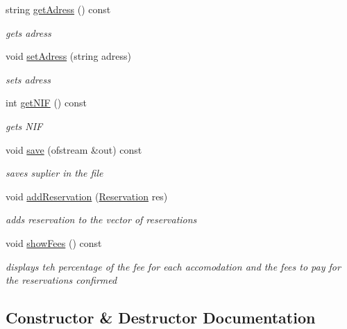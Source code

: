 \begin{DoxyCompactItemize}
$$string \hyperlink{class_suplier_ad6e654f4f26f6268b50f51df117793fb}{get\+Adress} () const
\begin{DoxyCompactList}\small\item\em gets adress \end{DoxyCompactList}\item 
void \hyperlink{class_suplier_a35d4dcc54e96c079ac8792806eeed739}{set\+Adress} (string adress)
\begin{DoxyCompactList}\small\item\em sets adress \end{DoxyCompactList}\item 
int \hyperlink{class_suplier_ae200d0fc598080361dccfc947dd071c5}{get\+N\+IF} () const
\begin{DoxyCompactList}\small\item\em gets N\+IF \end{DoxyCompactList}\item 
void \hyperlink{class_suplier_a91fbf47980aa9c9f3e55d9fcc0320201}{save} (ofstream \&out) const
\begin{DoxyCompactList}\small\item\em saves suplier in the file \end{DoxyCompactList}\item 
void \hyperlink{class_suplier_a2449d37d77317ea100c3d2866f8c8556}{add\+Reservation} (\hyperlink{class_reservation}{Reservation} res)
\begin{DoxyCompactList}\small\item\em adds reservation to the vector of reservations \end{DoxyCompactList}\item 
\hypertarget{class_suplier_ac455dce8b1768090654c0e5a5e840fb1}{}\label{class_suplier_ac455dce8b1768090654c0e5a5e840fb1} 
void \hyperlink{class_suplier_ac455dce8b1768090654c0e5a5e840fb1}{show\+Fees} () const
\begin{DoxyCompactList}\small\item\em displays teh percentage of the fee for each accomodation and the fees to pay for the reservations confirmed \end{DoxyCompactList}\end{DoxyCompactItemize}


\subsection{Constructor \& Destructor Documentation}
\hypertarget{class_suplier_a01702f1e6b57b187c8e0ecb06a9b2a4d}{}\label{class_suplier_a01702f1e6b57b187c8e0ecb06a9b2a4d} 
